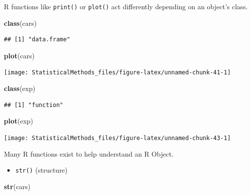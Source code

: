 \documentclass[
]{book}
\newenvironment{Shaded}{\begin{snugshade}}{\end{snugshade}}
\newcommand{\KeywordTok}[1]{\textcolor[rgb]{0.13,0.29,0.53}{\textbf{#1}}}
\newcommand{\NormalTok}[1]{#1}
\providecommand{\tightlist}{%
  \setlength{\itemsep}{0pt}\setlength{\parskip}{0pt}}
\theoremstyle{definition}
\theoremstyle{definition}
\theoremstyle{definition}
\theoremstyle{remark}
\begin{document}
R functions like \texttt{print()} or \texttt{plot()} act differently depending on an object's class.

\begin{Shaded}
\begin{Highlighting}[]
\KeywordTok{class}\NormalTok{(cars)}
\end{Highlighting}
\end{Shaded}

\begin{verbatim}
## [1] "data.frame"
\end{verbatim}

\begin{Shaded}
\begin{Highlighting}[]
\KeywordTok{plot}\NormalTok{(cars)}
\end{Highlighting}
\end{Shaded}

\begin{center}\texttt{[image: StatisticalMethods\_files/figure-latex/unnamed-chunk-41-1]} \end{center}

\begin{Shaded}
\begin{Highlighting}[]
\KeywordTok{class}\NormalTok{(exp)}
\end{Highlighting}
\end{Shaded}

\begin{verbatim}
## [1] "function"
\end{verbatim}

\begin{Shaded}
\begin{Highlighting}[]
\KeywordTok{plot}\NormalTok{(exp)}
\end{Highlighting}
\end{Shaded}

\begin{center}\texttt{[image: StatisticalMethods\_files/figure-latex/unnamed-chunk-43-1]} \end{center}

Many R functions exist to help understand an R Object.

\begin{itemize}
\tightlist
\item
  \texttt{str()} (structure)
\end{itemize}

\begin{Shaded}
\begin{Highlighting}[]
\KeywordTok{str}\NormalTok{(cars)}
\end{Highlighting}
\end{Shaded}
\end{document}
